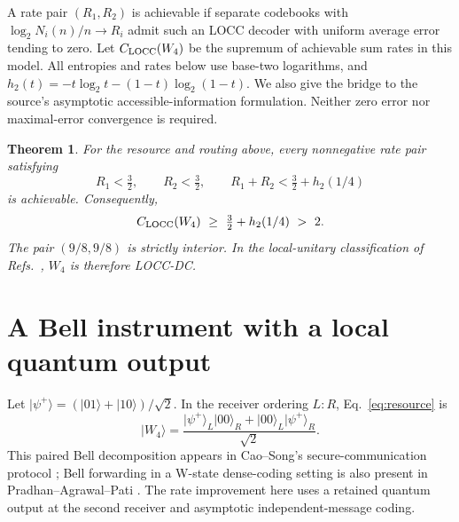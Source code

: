 \documentclass[11pt]{article}
\newtheorem{theorem}{Theorem}
\newcommand{\ket}[1]{\lvert #1\rangle}
\newcommand{\hbin}{h_2}
\begin{document}
A rate pair $(R_1,R_2)$ is achievable if separate codebooks with
$\log_2 N_i(n)/n\longrightarrow R_i$ admit such an LOCC decoder with uniform
average error tending to zero. Let $C_{\rm LOCC}(W_4)$ be the supremum of
achievable sum rates in this model. All entropies and rates below use base-two
logarithms, and $\hbin(t)=-t\log_2t-(1-t)\log_2(1-t)$.
We also give the bridge to the source's asymptotic accessible-information
formulation. Neither zero error nor maximal-error convergence is required.

\begin{theorem}\label{thm:main}
For the resource and routing above, every nonnegative rate pair satisfying
\begin{equation}\label{eq:region}
 R_1<\tfrac32,\qquad R_2<\tfrac32,\qquad
 R_1+R_2<\tfrac32+\hbin(1/4)
\end{equation}
is achievable. Consequently,
\begin{equation}\label{eq:bound}
 C_{\rm LOCC}(W_4)\ \geq\ \tfrac32+\hbin(1/4)\ >\ 2.
\end{equation}
The pair $(9/8,9/8)$ is strictly interior. In the local-unitary classification
of Refs.~\cite{bruss2004,bruss2006}, $W_4$ is therefore LOCC-DC.
\end{theorem}

\section{A Bell instrument with a local quantum output}
Let $\ket{\psi^+}=(\ket{01}+\ket{10})/\sqrt2$.
In the receiver ordering $L:R$, Eq.~\eqref{eq:resource}
is
\begin{equation}\label{eq:paired}
 \ket{W_4}=\frac{\ket{\psi^+}_L\ket{00}_R+
                         \ket{00}_L\ket{\psi^+}_R}{\sqrt2}.
\end{equation}
This paired Bell decomposition appears in Cao--Song's secure-communication
protocol \cite{cao}; Bell forwarding in a W-state dense-coding setting is
also present in Pradhan--Agrawal--Pati \cite{pradhan}. The rate improvement
here uses a retained quantum output at the second receiver and asymptotic
independent-message coding.
\end{document}
